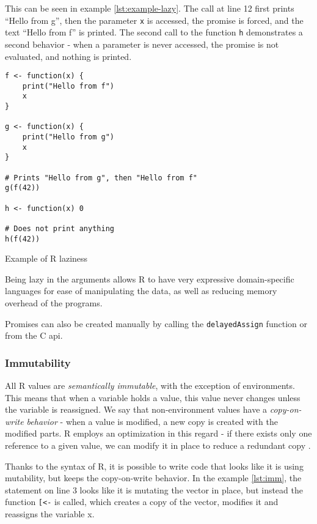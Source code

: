 This can be seen in example \ref{lst:example-lazy}. The call at line 12 first prints \enquote{Hello from g}, then the parameter \texttt{x} is accessed, the promise is forced, and the text \enquote{Hello from f} is printed. The second call to the function \texttt{h} demonstrates a second behavior - when a parameter is never accessed, the promise is not evaluated, and nothing is printed.

\begin{listing}[h!]
	\centering
	\begin{verbatim}
f <- function(x) {
    print("Hello from f")
    x
}

g <- function(x) {
    print("Hello from g")
    x
}

# Prints "Hello from g", then "Hello from f"
g(f(42))

h <- function(x) 0

# Does not print anything
h(f(42))
  \end{verbatim}
	\caption{Example of R laziness}\label{lst:example-lazy}
\end{listing}

Being lazy in the arguments allows R to have very expressive domain-specific languages for ease of manipulating the data, as well as reducing memory overhead of the programs.

Promises can also be created manually by calling the \texttt{delayedAssign} function or from the C api.

\subsubsection*{Immutability}

All R values are \textit{semantically immutable}, with the exception of environments. This means that when a variable holds a value, this value never changes unless the variable is reassigned. We say that non-environment values have a \textit{copy-on-write behavior} - when a value is modified, a new copy is created with the modified parts. R employs an optimization in this regard - if there exists only one reference to a given value, we can modify it in place to reduce a redundant copy .

Thanks to the syntax of R, it is possible to write code that looks like it is using mutability, but keeps the copy-on-write behavior. In the example \ref{lst:imm}, the statement on line 3 looks like it is mutating the vector in place, but instead the function \texttt{[<-} is called, which creates a copy of the vector, modifies it and reassigns the variable x.


